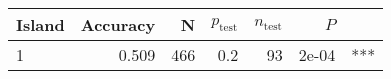 
\begin{tabular}{lrrrrrl}
\toprule
Island & Accuracy & N & $p_{\mbox{test}}$ & $n_{\mbox{test}}$ & $P$ & \\
\midrule
1 & 0.509 & 466 & 0.2 & 93 & 2e-04 & ***\\
\bottomrule
\end{tabular}
